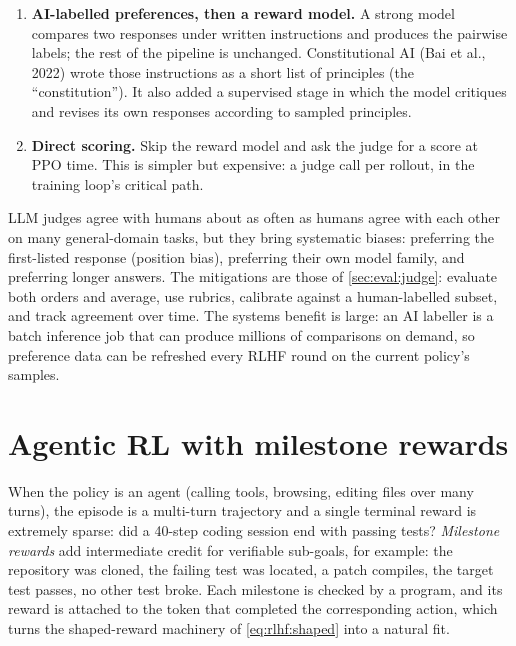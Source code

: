 \begin{enumerate}
  \item \textbf{AI-labelled preferences, then a reward model.} A strong model compares two responses
        under written instructions and produces the pairwise labels; the rest of the pipeline is unchanged.
        Constitutional AI (Bai et al., 2022) wrote those instructions as a short list of principles
        (the ``constitution''). It also added a supervised stage in which the model critiques and revises its own
        responses according to sampled principles.
  \item \textbf{Direct scoring.} Skip the reward model and ask the judge for a score at PPO time. This is
        simpler but expensive: a judge call per rollout, in the training loop's critical path.
\end{enumerate}

LLM judges agree with humans about as often as humans agree with each other on many
general-domain tasks, but they bring systematic biases: preferring the first-listed response
(position bias), preferring their own model family, and preferring longer answers. The mitigations are
those of \cref{sec:eval:judge}: evaluate both orders and average, use rubrics, calibrate against a
human-labelled subset, and track agreement over time. The systems benefit is large: an AI labeller
is a batch inference job that can produce millions of comparisons on demand, so preference data can
be refreshed every RLHF round on the current policy's samples.

\section{Agentic RL with milestone rewards}\label{sec:rlhf:agentic}

When the policy is an agent (calling tools, browsing, editing files over many turns), the episode
is a multi-turn trajectory and a single terminal reward is extremely sparse: did a 40-step
coding session end with passing tests? \emph{Milestone rewards} add intermediate credit for verifiable
sub-goals, for example: the repository was cloned, the failing test was located, a patch compiles, the
target test passes, no other test broke. Each milestone is checked by a program, and its reward is
attached to the token that completed the corresponding action, which turns the shaped-reward
machinery of \cref{eq:rlhf:shaped} into a natural fit.

